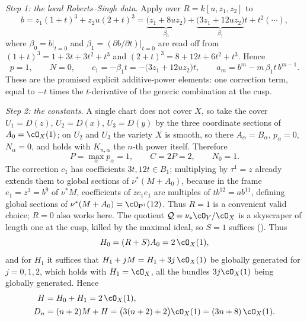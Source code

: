 \begin{example}
\emph{Step 1: the local Roberts--Singh data.}  Apply
 over $R=k[u,z_1,z_2]$ to
\[
 b=z_1(1+t)^3+z_2u(2+t)^3
 =\underbrace{\bigl(z_1+8uz_2\bigr)}_{\beta_0}
  +\underbrace{\bigl(3z_1+12uz_2\bigr)}_{\beta_1}t+t^2(\cdots),
\]
where $\beta_0=b|_{t=0}$ and $\beta_1=(\partial b/\partial t)|_{t=0}$
are read off from $(1+t)^3=1+3t+3t^2+t^3$ and
$(2+t)^3=8+12t+6t^2+t^3$.  Hence
\[
 p=1,
 \qquad
 N=0,
 \qquad
 c_1=-\beta_1t=-\bigl(3z_1+12uz_2\bigr)t,
 \qquad
 a_m=b^m-m\,\beta_1t\,b^{m-1}.
\]
These are the promised explicit additive-power elements: one correction
term, equal to $-t$ times the $t$-derivative of the generic combination
at the cusp.

\emph{Step 2: the constants.}  A single chart does not cover $X$, so take
the cover $U_1=D(z)$, $U_2=D(x)$, $U_3=D(y)$ by the three coordinate
sections of $A_0=\cO_X(1)$; on $U_2$ and $U_3$ the variety $X$ is
smooth, so there $A_\alpha=B_\alpha$, $p_\alpha=0$, $N_\alpha=0$, and
 holds with $K_{n,\alpha}$ the
$n$-th power itself.  Therefore
\[
 P=\max_\alpha p_\alpha=1,
 \qquad
 C=2P=2,
 \qquad
 N_0=1 .
\]
The correction $c_1$ has coefficients $3t,12t\in B_1$; multiplying by
$\tau^1=z$ already extends them to global sections of
$\nu^*(M+A_0)$, because in the frame $e_1=z^3=b^9$ of $\nu^*M$, coefficients of
$zc_1e_1$ are multiples of $t b^{12}=ab^{11}$, defining global
sections of $\nu^*(M+A_0)=\cO_{\mathbf P^1}(12)$.
Thus $R=1$ is a convenient valid choice; $R=0$ also works here.  The quotient $\mathcal Q=\nu_*\cO_Y/\cO_X$ is a
skyscraper of length one at the cusp, killed by the maximal ideal, so
$S=1$ suffices ().  Thus
\[
 H_0=(R+S)A_0=2\,\cO_X(1),
\]
and for $H_1$ it suffices that $H_1+jM=H_1+3j\,\cO_X(1)$ be globally
generated for $j=0,1,2$, which holds with $H_1=\cO_X$, all the bundles
$3j\cO_X(1)$ being globally generated.  Hence
\[
 \begin{aligned}
  H&=H_0+H_1=2\,\cO_X(1),\\
  D_n&=(n+2)M+H
      =\bigl(3(n+2)+2\bigr)\cO_X(1)
      =(3n+8)\,\cO_X(1).
 \end{aligned}
\]


\end{example}
